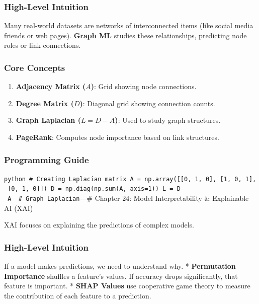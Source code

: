 \subsubsection{High-Level Intuition}\label{high-level-intuition-22}

Many real-world datasets are networks of interconnected items (like
social media friends or web pages). \textbf{Graph ML} studies these
relationships, predicting node roles or link connections.

\subsubsection{Core Concepts}\label{core-concepts-14}

\begin{enumerate}
\def\labelenumi{\arabic{enumi}.}
\tightlist
\item
  \textbf{Adjacency Matrix (\(A\))}: Grid showing node connections.
\item
  \textbf{Degree Matrix (\(D\))}: Diagonal grid showing connection
  counts.
\item
  \textbf{Graph Laplacian (\(L = D - A\))}: Used to study graph
  structures.
\item
  \textbf{PageRank}: Computes node importance based on link structures.
\end{enumerate}

\subsubsection{Programming Guide}\label{programming-guide-22}

\texttt{python\ \#\ Creating\ Laplacian\ matrix\ A\ =\ np.array({[}{[}0,\ 1,\ 0{]},\ {[}1,\ 0,\ 1{]},\ {[}0,\ 1,\ 0{]}{]})\ D\ =\ np.diag(np.sum(A,\ axis=1))\ L\ =\ D\ -\ A\ \ \#\ Graph\ Laplacian}\n\n---\n\n\#
Chapter 24: Model Interpretability \& Explainable AI (XAI)

XAI focuses on explaining the predictions of complex models.

\subsubsection{High-Level Intuition}\label{high-level-intuition-23}

If a model makes predictions, we need to understand why. *
\textbf{Permutation Importance} shuffles a feature's values. If accuracy
drops significantly, that feature is important. * \textbf{SHAP Values}
use cooperative game theory to measure the contribution of each feature
to a prediction.

